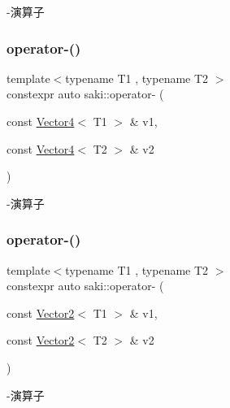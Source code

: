 -\/演算子 

\mbox{\label{namespacesaki_aa6f77e55cd25224c27c218790d7b1bf1}} 
\subsubsection{\texorpdfstring{operator-\/()}{operator-()}\hspace{0.1cm}{\footnotesize\ttfamily [3/5]}}
{\footnotesize\ttfamily template$<$typename T1 , typename T2 $>$ \\
constexpr auto saki\+::operator-\/ (\begin{DoxyParamCaption}\item[{const \mbox{\hyperlink{classsaki_1_1_vector4}{Vector4}}$<$ T1 $>$ \&}]{v1,  }\item[{const \mbox{\hyperlink{classsaki_1_1_vector4}{Vector4}}$<$ T2 $>$ \&}]{v2 }\end{DoxyParamCaption})}



-\/演算子 

\mbox{\label{namespacesaki_a4b1f99c0832914f9a23e0672cf9fd0fa}} 
\subsubsection{\texorpdfstring{operator-\/()}{operator-()}\hspace{0.1cm}{\footnotesize\ttfamily [4/5]}}
{\footnotesize\ttfamily template$<$typename T1 , typename T2 $>$ \\
constexpr auto saki\+::operator-\/ (\begin{DoxyParamCaption}\item[{const \mbox{\hyperlink{classsaki_1_1_vector2}{Vector2}}$<$ T1 $>$ \&}]{v1,  }\item[{const \mbox{\hyperlink{classsaki_1_1_vector2}{Vector2}}$<$ T2 $>$ \&}]{v2 }\end{DoxyParamCaption})}



-\/演算子 

\mbox{\label{namespacesaki_a6980888c403aa3728ab24202fe155295}} 
